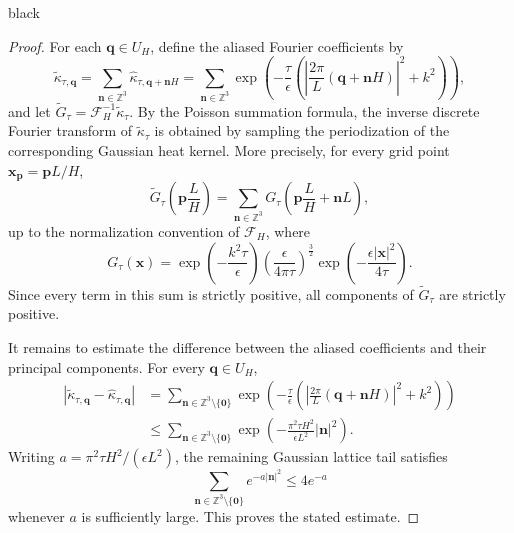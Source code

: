\documentclass[review,onefignum,onetabnum]{siamart250211}
\begin{document}
\begin{color}{black}
\begin{proof}
For each $\mathbf q\in U_H$, define the aliased Fourier coefficients by
\begin{equation}
\widetilde{\kappa}_{\tau,\mathbf q}
=
\sum_{\mathbf n\in\mathbb Z^3}
\hat{\kappa}_{\tau,\mathbf q+\mathbf nH}
=
\sum_{\mathbf n\in\mathbb Z^3}
\exp\left(
-\frac{\tau}{\epsilon}
\left(
\left|
\frac{2\pi}{L}
(\mathbf q+\mathbf nH)
\right|^2
+k^2
\right)
\right),
\end{equation}
and let
$\widetilde{G}_{\tau}
=
\mathcal{F}_H^{-1}\widetilde{\kappa}_{\tau}$.
By the Poisson summation formula, the inverse discrete Fourier transform of
$\widetilde{\kappa}_{\tau}$ is obtained by sampling the periodization of the
corresponding Gaussian heat kernel. More precisely, for every grid point
$\mathbf x_{\mathbf p}=\mathbf pL/H$,
\begin{equation}
\widetilde{G}_{\tau}
\left(
\mathbf p\frac{L}{H}
\right)
=
\sum_{\mathbf n\in\mathbb Z^3}
G_{\tau}
\left(
\mathbf p\frac{L}{H}+\mathbf nL
\right),
\end{equation}
up to the normalization convention of $\mathcal{F}_H$, where
\begin{equation}
G_{\tau}(\mathbf x)
=
\exp\left(-\frac{k^2\tau}{\epsilon}\right)
\left(\frac{\epsilon}{4\pi\tau}\right)^{\frac{3}{2}}
\exp\left(
-\frac{\epsilon|\mathbf x|^2}{4\tau}
\right).
\end{equation}
Since every term in this sum is strictly positive, all components of
$\widetilde{G}_{\tau}$ are strictly positive.

It remains to estimate the difference between the aliased coefficients and
their principal components. For every $\mathbf q\in U_H$,
\begin{equation}
\begin{aligned}
\left|
\widetilde{\kappa}_{\tau,\mathbf q}
-
\hat{\kappa}_{\tau,\mathbf q}
\right|
&=
\sum_{\mathbf n\in\mathbb Z^3\setminus\{\mathbf0\}}
\exp\left(
-\frac{\tau}{\epsilon}
\left(
\left|
\frac{2\pi}{L}
(\mathbf q+\mathbf nH)
\right|^2
+k^2
\right)
\right)
\\
&\leq
\sum_{\mathbf n\in\mathbb Z^3\setminus\{\mathbf0\}}
\exp\left(
-\frac{\pi^2\tau H^2}{\epsilon L^2}
|\mathbf n|^2
\right).
\end{aligned}
\end{equation}
Writing $a=\pi^2\tau H^2/(\epsilon L^2)$, the remaining Gaussian lattice
tail satisfies
\begin{equation}
\sum_{\mathbf n\in\mathbb Z^3\setminus\{\mathbf0\}}
e^{-a|\mathbf n|^2}
\leq 4e^{-a}
\end{equation}
whenever $a$ is sufficiently large. This proves the stated estimate.


\end{proof}
\end{color}
\end{document}
